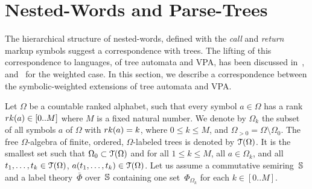 




\newpage
\appendix 



\section{Nested-Words and Parse-Trees}
\label{sec:trees}
The hierarchical structure of nested-words, defined with the \emph{call} and \emph{return} markup symbols  
suggest a correspondence with trees. 
The lifting of this correspondence to languages, of tree automata and VPA,
has been discussed in~\cite{AlurMadhusudan09nested}, 
and~\cite{Caralp12VPAmult} for the weighted case.
In this section, we describe a correspondence between the symbolic-weighted extensions
of tree automata and VPA.

Let $\Omega$ be a countable ranked alphabet, such that 
every symbol $a \in \Omega$ has a rank 
$\rank(a) \in [0..M]$ where $M$ is a fixed natural number.
We denote by $\Omega_k$ the subset of all symbols $a$ of $\Omega$
with $\rank(a) = k$, where $0 \leq k \leq M$, 
and $\Omega_{>0} = \Omega \setminus \Omega_0$.
%
\noindent 
The free $\Omega$-algebra of finite, ordered, 
$\Omega$-labeled trees is denoted by $\mathcal{T}(\Omega)$.
It is the smallest set such that  $\Omega_0 \subset \mathcal{T}(\Omega)$
and for all $1 \leq k \leq M$, all $a \in \Omega_k$, 
and all $t_1, \ldots, t_k \in \mathcal{T}(\Omega)$, $a(t_1, \ldots, t_k) \in \mathcal{T}(\Omega)$.
%
%
Let us assume a commutative semiring~$\mathbb{S}$ 
and a label theory~$\bar{\Phi}$ over~$\mathbb{S}$ 
containing one set~$\Phi_{\Omega_k}$ for each $k \in [0..M]$.
%
\renewcommand{\call}[1]{\ensuremath \langle_{#1}}
\renewcommand{\return}[1]{\ensuremath {}_{#1}{\rangle}} %

